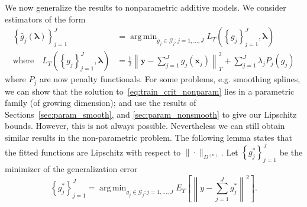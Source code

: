 \documentclass[12pt]{article} %
\theoremstyle{definition}
\DeclareMathOperator*{\argmin}{arg\,min}
\begin{document}
We now generalize the results to nonparametric additive models. We consider estimators of the form
\begin{align}
\label{eq:train_crit_nonparam}
\left\{ \hat{g}_j( \boldsymbol \lambda) \right \}_{j=1}^J &= 
\argmin_{g_j\in \mathcal{G}_j: j=1,...,J}  L_T\left (\left \{ g_j \right \}_{j=1}^J, \boldsymbol{\lambda} \right ) \\
\text{where} \quad L_T \left (\left \{ g_j \right \}_{j=1}^J, \boldsymbol{\lambda} \right ) &=
\frac{1}{2} \left \| \boldsymbol y -  \sum_{j=1}^J g_j(\boldsymbol x_j) \right \|^2_T 
+ \sum_{j=1}^J \lambda_j P_j(g_j)
\end{align}
where $P_j$ are now penalty functionals. For some problems, e.g. smoothing splines, we can show that the solution to~\eqref{eq:train_crit_nonparam} lies in a parametric family (of growing dimension); and use the results of Sections~\ref{sec:param_smooth}, and \ref{sec:param_nonsmooth} to give our Lipschitz bounds. However, this is not always possible. Nevertheless we can still obtain similar results in the non-parametric problem. The following lemma states that the fitted functions are Lipschitz with respect to $\| \cdot \|_{D^{(n)}}$. Let $\left\{ g_j^* \right \}_{j=1}^J$ be the minimizer of the generalization error
\begin{equation}
\left\{ g_j^* \right \}_{j=1}^J = \argmin_{g_j \in \mathcal{G}_j: j=1,...,J} E_T\left[ \left \| y - \sum_{j=1}^J g_j^* \right \|^2 \right].
\end{equation}
\end{document}
